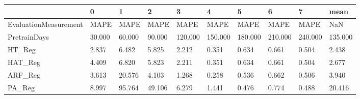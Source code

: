 \begin{tabular}{llllllllll}
\toprule
{} &      0 &      1 &      2 &       3 &       4 &       5 &       6 &       7 &    mean \\
\midrule
EvaluationMeasurement &   MAPE &   MAPE &   MAPE &    MAPE &    MAPE &    MAPE &    MAPE &    MAPE &     NaN \\
PretrainDays          & 30.000 & 60.000 & 90.000 & 120.000 & 150.000 & 180.000 & 210.000 & 240.000 & 135.000 \\
HT\_Reg                &  2.837 &  6.482 &  5.825 &   2.212 &   0.351 &   0.634 &   0.661 &   0.504 &   2.438 \\
HAT\_Reg               &  4.409 &  6.820 &  5.823 &   2.211 &   0.351 &   0.634 &   0.661 &   0.504 &   2.677 \\
ARF\_Reg               &  3.613 & 20.576 &  4.103 &   1.268 &   0.258 &   0.536 &   0.662 &   0.506 &   3.940 \\
PA\_Reg                &  8.997 & 95.764 & 49.106 &   6.279 &   1.441 &   0.476 &   0.774 &   0.488 &  20.416 \\
\bottomrule
\end{tabular}

